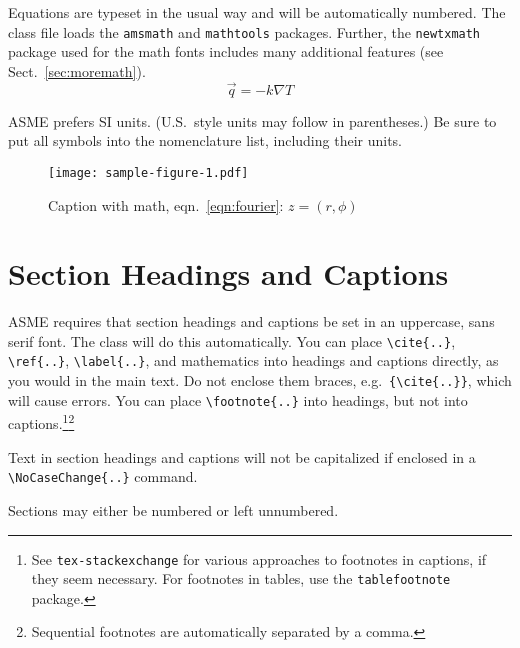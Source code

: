 \documentclass[balance,upint,subscriptcorrection,varvw,mathalfa=cal=boondoxo,spanish,french,vietnamese,russian,greek,pdf-a,colorlinks]{asmeconf}
\begin{document}
Equations are typeset in the usual way and will be automatically numbered.  The class file loads the \texttt{amsmath} and \texttt{mathtools} packages. Further, the \texttt{newtxmath} package used for the math fonts includes many additional features (see Sect.~\ref{sec:moremath}).
\begin{equation}\label{eqn:fourier}
\vec{q} = -k\nabla T
\end{equation}

ASME prefers SI units. (U.S.\ style units may follow in parentheses.) Be sure to put all symbols into the nomenclature list, including their units.




\begin{figure}
\centering\texttt{[image: sample-figure-1.pdf]}
\caption{Caption with math, eqn.~\eqref{eqn:fourier}: $z = (r,\phi)$ \cite{Lienhard2019b}}\label{fig:1}
\end{figure}
 




\section{Section Headings and Captions}

ASME requires that section headings and captions be set in an uppercase, sans serif font.  The class will do this automatically.  You can place \verb|\cite{..}|, \verb|\ref{..}|, \verb|\label{..}|, and mathematics into headings and captions directly, as you would in the main text. Do not enclose them braces, e.g.\ \verb|{\cite{..}}|, which will cause errors. You can place \verb|\footnote{..}| into headings, but not into captions.\footnote{See \texttt{tex-stackexchange} for various approaches to footnotes in captions, if they seem necessary. For footnotes in tables, use the \texttt{tablefootnote} package.}\footnote{Sequential footnotes are automatically separated by a comma.}

Text in section headings and captions will not be capitalized if enclosed in a \verb|\NoCaseChange{..}| command.

Sections may either be numbered or left unnumbered.
\end{document}
